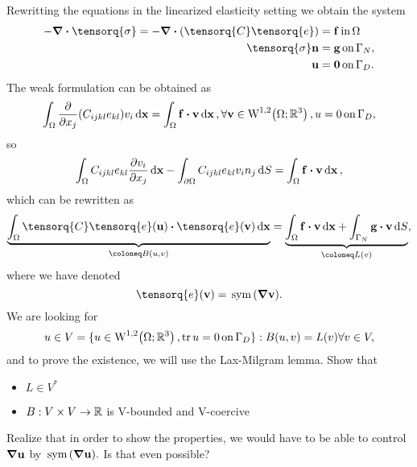 \documentclass[reqno, a4paper]{article}
\begin{document}
Rewritting the equations in the linearized elasticity setting we obtain the system
\begin{align*}
	-\divergence{\tensorq{\sigma}} = - \divergence{\qty(\tensorq{C}\tensorq{e})} &= \vb{f} \, \text{in} \, \Omega \\
	\tensorq{\sigma}\vb{n} &= \vb{g} \, \text{on} \, \Gamma_{N}, \\
	\vb{u} &= \vb{0} \, \text{on} \, \Gamma_{D}.
\end{align*}
The weak formulation can be obtained as
\[
	\int_{\Omega} \pdv{x_j}\qty(C_{ijkl}e_{kl})v_i \dd{\vb{x}} = \int_{\Omega}\vb{f}\vdot \vb{v}\dd{\vb{x}}, \forall \vb{v} \in \WkpSet[1][2]{\Omega;\R^3}, u=0 \, \text{on} \, \Gamma_D,
\]
so
\[
	\int_{\Omega}C_{ijkl}e_{kl} \pdv{v_i}{x_j}\dd{\vb{x}}-\int_{\partial \Omega}C_{ijkl}e_{kl}v_i n_j \dd{S} = \int_{\Omega}\vb{f}\vdot \vb{v}\dd{\vb{x}},
\]
which can be rewritten as
\[
	\underbrace{\int_{\Omega}\tensorq{C}\tensorq{e}\qty(\vb{u}) \vdot \tensorq{e}\qty(\vb{v})\dd{\vb{x}}}_{\coloneq B\qty(u,v)} = \underbrace{\int_{\Omega}\vb{f} \vdot \vb{v}\dd{\vb{x}} + \int_{\Gamma_N}\vb{g}\vdot \vb{v}\dd{S}}_{\coloneq L(v)},
\]
where we have denoted
\[
	\tensorq{e}\qty(\vb{v}) = \, \text{sym} \,\qty(\grad \vb{v}).
\]
We are looking for
\[
	u \in V = \{ u \in \WkpSet[1][2]{\Omega; \R^3}, \tr u = 0 \, \text{on} \,\Gamma_D\}: B\qty(u,v) = L(v) \forall v \in V,
\]
and to prove the existence, we will use the Lax-Milgram lemma. Show that
\begin{itemize}
	\item $L \in V^{*}$
	\item $B:V \times V \to {\mathbb R}$ is V-bounded and V-coercive
\end{itemize}
Realize that in order to show the properties, we would have to be able to control $\grad \vb{u}$ by $\, \text{sym} \,\qty(\grad \vb{u}).$ Is that even possible?
\end{document}
